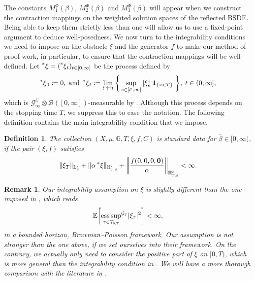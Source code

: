 \documentclass[10pt]{article} %
\newtheorem{definition}[theorem]{Definition}
\newtheorem{remark}[theorem]{Remark}
\newcommand\cB{\mathcal B}
\newcommand\cG{\mathcal G}
\newcommand\cT{\mathcal T}
\newcommand{\smalltext}[1]{\text{\fontsize{4}{4}\selectfont$#1$}}
\def \E{\mathbb{E}}
\def \G{\mathbb{G}}
\def \H{\mathbb{H}}
\def \L{\mathbb{L}}
\newcommand{\brs}[1]{\prescript{\ast}{}{#1}}
\newcommand{\1}{\mathbf{1}}
\DeclareMathOperator*{\esssup}{ess\,sup}
\begin{document}
The constants $M^\Phi_1(\beta)$, $M^\Phi_2(\beta)$ and $M^\Phi_3(\beta)$ will appear when we construct the contraction mappings on the weighted solution spaces of the reflected BSDE. Being able to keep them strictly less than one will allow us to use a fixed-point argument to deduce well-posedness. We now turn to the integrability conditions we need to impose on the obstacle $\xi$ and the generator $f$ to make our method of proof work, in particular, to ensure that the contraction mappings will be well-defined. Let $\brs{\xi} = (\brs{\xi}_t)_{t \in [0,\infty]}$ be the process defined by
\begin{equation}\label{eq::left_limit_xi}
	\brs{\xi}_0 \coloneqq 0, \; \text{and} \; \brs{\xi}_t \coloneqq \lim_{t^{\smalltext{\prime}} \uparrow\uparrow t}\bigg\{\sup_{s \in [t^\smalltext{\prime},\infty]} |\xi^+_s \mathbf{1}_{\{s < T\}}|\bigg\}, \; t \in (0,\infty],
\end{equation}
which is $\cG^U_\infty \otimes \cB([0,\infty])$-measurable by \cite[Proposition 2.21]{karoui2013capacities}. Although this process depends on the stopping time $T$, we suppress this to ease the notation. The following definition contains the main integrability condition that we impose.
\begin{definition}\label{def::standard_data}
The collection $(X,\mu,\G,T,\xi,f,C)$ is \emph{standard data for $\hat\beta \in [0,\infty)$}, if the pair $(\xi,f)$ satisfies
\begin{equation*}
		\|\xi_T\|_{\L^\smalltext{2}_\smalltext{\hat\beta}} + \|\alpha \brs{\xi}\|_{\H^\smalltext{2}_{\smalltext{T}\smalltext{,}\smalltext{\hat\beta}}} + \bigg\|\frac{f(0,0,0,\mathbf{0})}{\alpha}\bigg\|_{\H^\smalltext{2}_{\smalltext{T}\smalltext{,}\smalltext{\hat\beta}}}  < \infty.
	\end{equation*}
\end{definition}

\begin{remark}
	Our integrability assumption on $\xi$ is slightly different than the one imposed in {\rm\cite{grigorova2017reflected,grigorova2020optimal}}, which reads
		\begin{equation*}
		\E\bigg[{\esssup_{\tau \in \cT_{\smalltext{0}\smalltext{,}\smalltext{T}}}}^{\cG_\smalltext{T}} |\xi_\tau|^2\bigg] < \infty,
	\end{equation*}
	in a bounded horizon, Brownian--Poisson framework. Our assumption is not stronger than the one above, if we set ourselves into their framework. On the contrary, we actually only need to consider the positive part of $\xi$ on $[0,T)$, which is more general than the integrability condition in {\rm\cite{grigorova2017reflected,grigorova2020optimal}}. We will have a more thorough comparison with the literature in {\rm{}}.
\end{remark}
\end{document}
